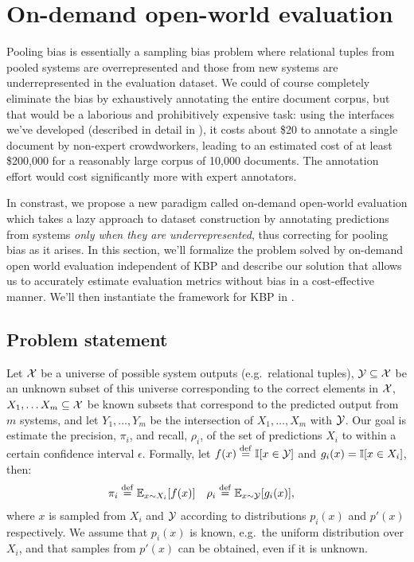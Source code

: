 \section{On-demand open-world evaluation}
\label{sec:methodology}

Pooling bias is essentially a sampling bias problem where relational tuples from pooled systems are overrepresented and those from new systems are underrepresented in the evaluation dataset.
We could of course completely eliminate the bias by exhaustively annotating the entire document corpus, but that would be a laborious and prohibitively expensive task:
  using the interfaces we've developed (described in detail in ), it costs about \$20 to annotate a single document by non-expert crowdworkers, leading to an estimated cost of at least \$200,000 for a reasonably large corpus of 10,000 documents.
The annotation effort would cost significantly more with expert annotators.

In constrast, we propose a new paradigm called on-demand open-world evaluation which takes a lazy approach to dataset construction by annotating predictions from systems \textit{only when they are underrepresented}, thus correcting for pooling bias as it arises.
In this section, we'll formalize the problem solved by on-demand open world evaluation independent of KBP and describe our solution that allows us to accurately estimate evaluation metrics without bias in a cost-effective manner. 
We'll then instantiate the framework for KBP in .

\subsection{Problem statement}
Let $\mathcal{X}$ be a universe of possible system outputs (e.g.\ relational tuples),
  $\mathcal{Y} \subseteq \mathcal{X}$ be an unknown subset of this universe corresponding to the correct elements in $\mathcal{X}$,
  $X_1, \ldots X_m \subseteq \mathcal{X}$ be known subsets that correspond to the predicted output from $m$ systems,
  and let $Y_1, \ldots, Y_m$ be the intersection of $X_1, \ldots, X_m$ with $\mathcal{Y}$.
Our goal is estimate the precision, $\pi_i$, and recall, $\rho_i$, of the set of predictions $X_i$ to within a certain confidence interval $\epsilon$.
Formally, let $f(x) \stackrel{\rm def}{=} \mathbb{I}[x \in \mathcal{Y}]$ and $g_i(x) = \mathbb{I}[x \in X_i]$, then:
\begin{align*}
  \pi_i  &\stackrel{\rm def}{=} \mathbb{E}_{x \sim X_i}[f(x)] &
  \rho_i &\stackrel{\rm def}{=} \mathbb{E}_{x \sim \mathcal{Y}}[g_i(x)],
\end{align*}
where $x$ is sampled from $X_i$ and $\mathcal{Y}$ according to distributions $p_i(x)$ and $p'(x)$ respectively.
We assume that $p_i(x)$ is known, e.g.\ the uniform distribution over $X_i$, and that samples from $p'(x)$ can be obtained, even if it is unknown.

